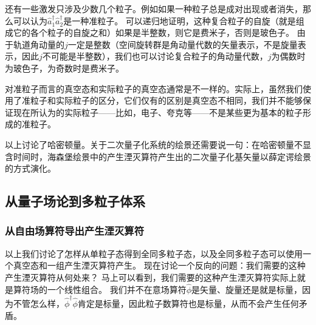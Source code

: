 \documentclass[hyperref, UTF8, a4paper]{ctexart}
\begin{document}
还有一些激发只涉及少数几个粒子。例如如果一种粒子总是成对出现或者消失，那么可以认为$\hat{a}^\dagger_1 \hat{a}^\dagger_2$是一种准粒子。
可以递归地证明，这种复合粒子的自旋（就是组成它的各个粒子的自旋之和）如果是半整数，则它是费米子，否则是玻色子。
由于轨道角动量的$j$一定是整数（空间旋转群是角动量代数的矢量表示，不是旋量表示，因此$j$不可能是半整数），我们也可以讨论复合粒子的角动量代数，$j$为偶数时为玻色子，为奇数时是费米子。

对准粒子而言的真空态和实际粒子的真空态通常是不一样的。实际上，虽然我们使用了准粒子和实际粒子的区分，它们仅有的区别是真空态不相同，我们并不能够保证现在所认为的实际粒子——比如，电子、夸克等——不是某些更为基本的粒子形成的准粒子。

以上讨论了哈密顿量。关于二次量子化系统的绘景还需要说一句：在哈密顿量不显含时间时，海森堡绘景中的产生湮灭算符产生出的二次量子化基矢量以薛定谔绘景的方式演化。

\subsection{从量子场论到多粒子体系}\label{sec:from-qft-to-many-body}

\subsubsection{从自由场算符导出产生湮灭算符}\label{sec:c-a-operator-from-field}

以上我们讨论了怎样从单粒子态得到全同多粒子态，以及全同多粒子态可以使用一个真空态和一组产生湮灭算符产生。
现在讨论一个反向的问题：我们需要的这种产生湮灭算符从何处来？
马上可以看到，我们需要的这种产生湮灭算符实际上就是算符场的一个线性组合。
我们并不在意场算符$\hat{\phi}$是矢量、旋量还是就是标量，因为不管怎么样，$\hat{\phi}^\dagger \hat{\phi}$肯定是标量，因此粒子数算符也是标量，从而不会产生任何矛盾。
\end{document}
